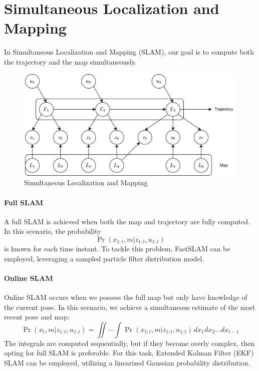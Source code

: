 \section{Simultaneous Localization and Mapping}

In Simultaneous Localization and Mapping (SLAM), our goal is to compute both the trajectory and the map simultaneously.
\begin{figure}[H]
    \centering
    \includegraphics[width=0.75\linewidth]{images/slam.png}
    \caption{Simultaneous Localization and Mapping}
\end{figure}

\paragraph*{Full SLAM}
A full SLAM is achieved when both the map and trajectory are fully computed. 
In this scenario, the probability
\[\Pr(x_{1:t},m|z_{1:t},u_{1:t})\]
is known for each time instant. 
To tackle this problem, FastSLAM can be employed, leveraging a sampled particle filter distribution model.

\paragraph*{Online SLAM}
Online SLAM occurs when we possess the full map but only have knowledge of the current pose. 
In this scenario, we achieve a simultaneous estimate of the most recent pose and map:
\[\Pr(x_t,m|z_{1:t},u_{1:t})=\iint\cdots\int\Pr(x_{1:t},m|z_{1:t},u_{1:t})\,dx_1dx_2\dots dx_{t-1}\]
The integrals are computed sequentially, but if they become overly complex, then opting for full SLAM is preferable. 
For this task, Extended Kalman Filter (EKF) SLAM can be employed, utilizing a linearized Gaussian probability distribution.